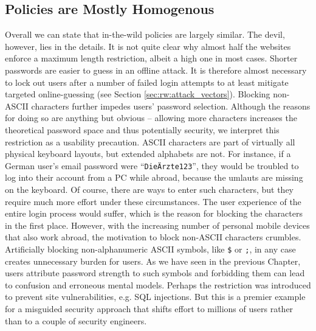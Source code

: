 \subsection{Policies are Mostly Homogenous}
Overall we can state that in-the-wild policies are largely similar. The devil, however, lies in the details. It is not quite clear why almost half the websites enforce a maximum length restriction, albeit a high one in most cases. Shorter passwords are easier to guess in an offline attack. It is therefore almost necessary to lock out users after a number of failed login attempts to at least mitigate targeted online-guessing (see Section \ref{sec:rw:attack_vectors}). Blocking non-ASCII characters further impedes users' password selection. Although the reasons for doing so are anything but obvious -- allowing more characters increases the theoretical password space and thus potentially security, we interpret this restriction as a usability precaution. ASCII characters are part of virtually all physical keyboard layouts, but extended alphabets are not. For instance, if a German user's email password were ``\texttt{DieÄrzte123}'', they would be troubled to log into their account from a PC while abroad, because the umlauts are missing on the keyboard. Of course, there are ways to enter such characters, but they require much more effort under these circumstances. The user experience of the entire login process would suffer, which is the reason for blocking the characters in the first place. However, with the increasing number of personal mobile devices that also work abroad, the motivation to block non-ASCII characters crumbles. Artificially blocking non-alphanumeric ASCII symbols, like \texttt{\$} or \texttt{;}, in any case creates unnecessary burden for users. As we have seen in the previous Chapter, users attribute password strength to such symbols and forbidding them can lead to confusion and erroneous mental models. Perhaps the restriction was introduced to prevent site vulnerabilities, e.g. SQL injections. But this is a premier example for a misguided security approach that shifts effort to millions of users rather than to a couple of security engineers. 


